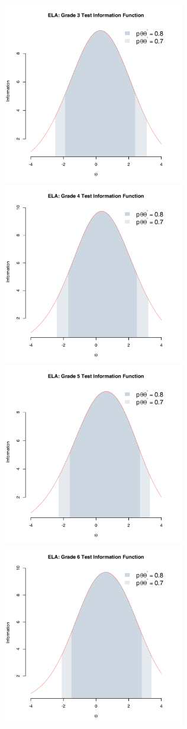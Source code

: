 \documentclass[]{article}
\begin{document}
\FloatBarrier

\includegraphics[width=\textwidth,height=3.125in]{tifs/ela3tif.pdf}
\includegraphics[width=\textwidth,height=3.125in]{tifs/ela4tif.pdf}
\includegraphics[width=\textwidth,height=3.125in]{tifs/ela5tif.pdf}
\includegraphics[width=\textwidth,height=3.125in]{tifs/ela6tif.pdf}
\end{document}
